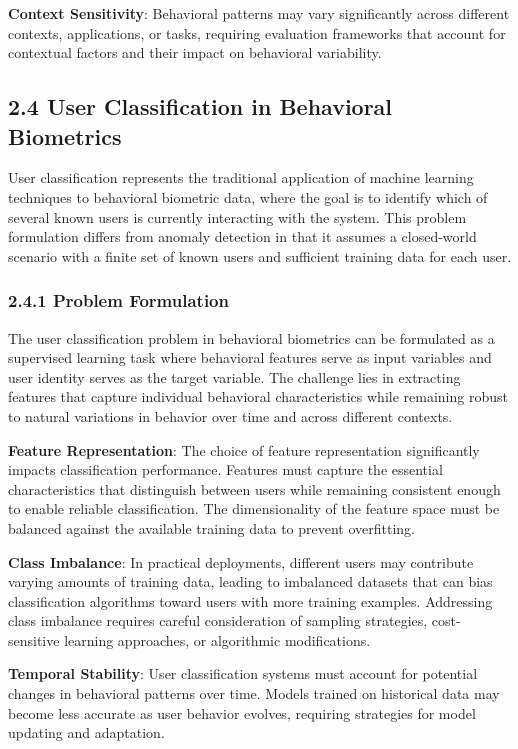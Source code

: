 \documentclass[
  11pt,
  a4paper,
]{article}
\begin{document}
\textbf{Context Sensitivity}: Behavioral patterns may vary significantly
across different contexts, applications, or tasks, requiring evaluation
frameworks that account for contextual factors and their impact on
behavioral variability.

\subsection{2.4 User Classification in Behavioral
Biometrics}\label{user-classification-in-behavioral-biometrics}

User classification represents the traditional application of machine
learning techniques to behavioral biometric data, where the goal is to
identify which of several known users is currently interacting with the
system. This problem formulation differs from anomaly detection in that
it assumes a closed-world scenario with a finite set of known users and
sufficient training data for each user.

\subsubsection{2.4.1 Problem Formulation}\label{problem-formulation}

The user classification problem in behavioral biometrics can be
formulated as a supervised learning task where behavioral features serve
as input variables and user identity serves as the target variable. The
challenge lies in extracting features that capture individual behavioral
characteristics while remaining robust to natural variations in behavior
over time and across different contexts.

\textbf{Feature Representation}: The choice of feature representation
significantly impacts classification performance. Features must capture
the essential characteristics that distinguish between users while
remaining consistent enough to enable reliable classification. The
dimensionality of the feature space must be balanced against the
available training data to prevent overfitting.

\textbf{Class Imbalance}: In practical deployments, different users may
contribute varying amounts of training data, leading to imbalanced
datasets that can bias classification algorithms toward users with more
training examples. Addressing class imbalance requires careful
consideration of sampling strategies, cost-sensitive learning
approaches, or algorithmic modifications.

\textbf{Temporal Stability}: User classification systems must account
for potential changes in behavioral patterns over time. Models trained
on historical data may become less accurate as user behavior evolves,
requiring strategies for model updating and adaptation.
\end{document}
